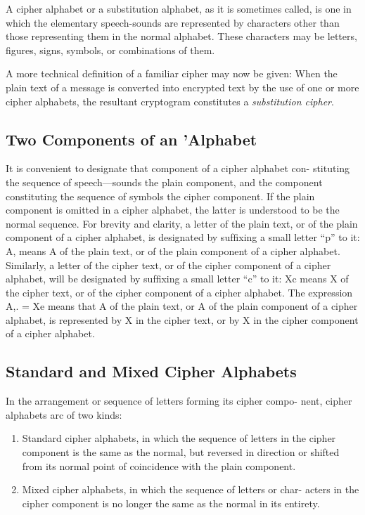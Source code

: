 \mypara A cipher alphabet or a substitution alphabet, as it is sometimes
called, is one in which the elementary speech-sounds are represented by
characters other than those representing them in the normal alphabet.
These characters may be letters, ﬁgures, signs, symbols, or combinations
of them.

\mypara A more technical deﬁnition of a familiar cipher may now be given:
When the plain text of a message is converted into encrypted text by the
use of one or more cipher alphabets, the resultant cryptogram constitutes
a \textit{substitution cipher}.

\subsection{Two Components of an 'Alphabet}

It is convenient to designate that component of a cipher alphabet con-
stituting the sequence of speech—sounds the plain component, and the
component constituting the sequence of symbols the cipher component. If
the plain component is omitted in a cipher alphabet, the latter is understood to be the normal sequence. For brevity and clarity, a letter of the
plain text, or of the plain component of a cipher alphabet, is designated
by sufﬁxing a small letter “p” to it: A, means A of the plain text, or of
the plain component of a cipher alphabet. Similarly, a letter of the cipher
text, or of the cipher component of a cipher alphabet, will be designated
by sufﬁxing a small letter “c” to it: Xc means X of the cipher text, or
of the cipher component of a cipher alphabet. The expression A,. = Xe
means that A of the plain text, or A of the plain component of a cipher
alphabet, is represented by X in the cipher text, or by X in the cipher
component of a cipher alphabet.

\subsection{Standard and Mixed Cipher Alphabets}

In the arrangement or sequence of letters forming its cipher compo-
nent, cipher alphabets arc of two kinds:

\begin{enumerate}[label=\alph*]
\item Standard cipher alphabets, in which the sequence of letters in the
cipher component is the same as the normal, but reversed in direction or
shifted from its normal point of coincidence with the plain component.

\item Mixed cipher alphabets, in which the sequence of letters or char-
acters in the cipher component is no longer the same as the normal in its
entirety.
\end{enumerate}


